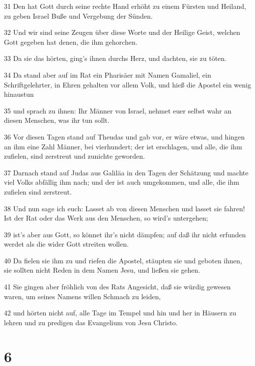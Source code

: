 \par 31 Den hat Gott durch seine rechte Hand erhöht zu einem Fürsten und Heiland, zu geben Israel Buße und Vergebung der Sünden.
\par 32 Und wir sind seine Zeugen über diese Worte und der Heilige Geist, welchen Gott gegeben hat denen, die ihm gehorchen.
\par 33 Da sie das hörten, ging's ihnen durchs Herz, und dachten, sie zu töten.
\par 34 Da stand aber auf im Rat ein Pharisäer mit Namen Gamaliel, ein Schriftgelehrter, in Ehren gehalten vor allem Volk, und hieß die Apostel ein wenig hinaustun
\par 35 und sprach zu ihnen: Ihr Männer von Israel, nehmet euer selbst wahr an diesen Menschen, was ihr tun sollt.
\par 36 Vor diesen Tagen stand auf Theudas und gab vor, er wäre etwas, und hingen an ihm eine Zahl Männer, bei vierhundert; der ist erschlagen, und alle, die ihm zufielen, sind zerstreut und zunichte geworden.
\par 37 Darnach stand auf Judas aus Galiläa in den Tagen der Schätzung und machte viel Volks abfällig ihm nach; und der ist auch umgekommen, und alle, die ihm zufielen sind zerstreut.
\par 38 Und nun sage ich euch: Lasset ab von diesen Menschen und lasset sie fahren! Ist der Rat oder das Werk aus den Menschen, so wird's untergehen;
\par 39 ist's aber aus Gott, so könnet ihr's nicht dämpfen; auf daß ihr nicht erfunden werdet als die wider Gott streiten wollen.
\par 40 Da fielen sie ihm zu und riefen die Apostel, stäupten sie und geboten ihnen, sie sollten nicht Reden in dem Namen Jesu, und ließen sie gehen.
\par 41 Sie gingen aber fröhlich von des Rats Angesicht, daß sie würdig gewesen waren, um seines Namens willen Schmach zu leiden,
\par 42 und hörten nicht auf, alle Tage im Tempel und hin und her in Häusern zu lehren und zu predigen das Evangelium von Jesu Christo.

\chapter{6}

